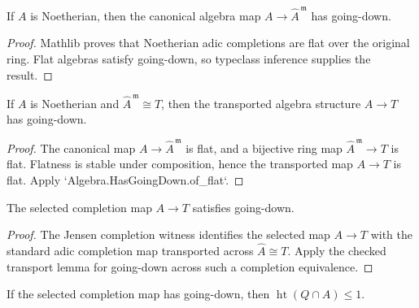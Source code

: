\begin{lemma}
  \label{lem:adic_completion_has_going_down_of_is_noetherian}
  If \(A\) is Noetherian, then the canonical algebra map
  \(A\to\widehat A^{\,\mathfrak m}\) has going-down.
\end{lemma}

\begin{proof}
  Mathlib proves that Noetherian adic completions are flat over the original
  ring.  Flat algebras satisfy going-down, so typeclass inference supplies the
  result.
\end{proof}

\begin{lemma}
  \label{lem:adic_completion_equiv_has_going_down_of_is_noetherian}
  If \(A\) is Noetherian and \(\widehat A^{\,\mathfrak m}\cong T\), then the
  transported algebra structure \(A\to T\) has going-down.
\end{lemma}

\begin{proof}
  The canonical map \(A\to\widehat A^{\,\mathfrak m}\) is flat, and a bijective
  ring map \(\widehat A^{\,\mathfrak m}\to T\) is flat.  Flatness is stable
  under composition, hence the transported map \(A\to T\) is flat.  Apply
  `Algebra.HasGoingDown.of_flat`.
\end{proof}

\begin{lemma}
  \label{lem:completion_map_has_going_down_source}
  The selected completion map \(A\to T\) satisfies going-down.
\end{lemma}

\begin{proof}
  The Jensen completion witness identifies the selected map \(A\to T\) with
  the standard adic completion map transported across
  \(\widehat A\cong T\).  Apply the checked transport lemma for going-down
  across such a completion equivalence.
\end{proof}

\begin{lemma}
  \label{lem:contracted_prime_height_le_one_of_has_going_down_source}
  If the selected completion map has going-down, then
  \(\operatorname{ht}(Q\cap A)\leq1\).
\end{lemma}

